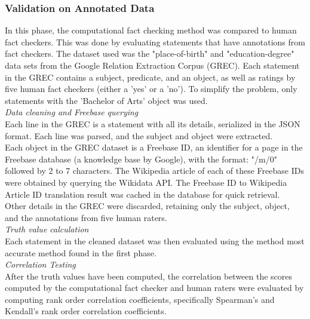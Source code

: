 \documentclass[10pt,11pt,12pt,oneside]{book}
\begin{document}
\subsubsection{Validation on Annotated Data}

In this phase, the computational fact checking method was compared to human fact checkers. This was done by evaluating statements that have annotations from fact checkers. The dataset used was the "place-of-birth" and "education-degree" data sets from the Google Relation Extraction Corpus (GREC). Each statement in the GREC contains a subject, predicate, and an object, as well as ratings by five human fact checkers (either a 'yes' or a 'no'). To simplify the problem, only statements with the 'Bachelor of Arts' object was used.\\



\textit{Data cleaning and Freebase querying}\\
Each line in the GREC is a statement with all its details, serialized in the JSON format. Each line was parsed, and the subject and object were extracted. \\

Each object in the GREC dataset is a Freebase ID, an identifier for a page in the Freebase database (a knowledge base by Google), with the format: "/m/0" followed by 2 to 7 characters. The Wikipedia article of each of these Freebase IDs were obtained by querying the Wikidata API. The Freebase ID to Wikipedia Article ID translation result was cached in the database for quick retrieval.\\

Other details in the GREC were discarded, retaining only the subject, object, and the annotations from five human raters.\\

\textit{Truth value calculation}\\

Each statement in the cleaned dataset was then evaluated using the method most accurate method found in the first phase.\\

\textit{Correlation Testing}\\
After the truth values have been computed, the correlation between the scores computed by the computational fact checker and human raters were evaluated by computing rank order correlation coefficients, specifically Spearman's and Kendall's rank order correlation coefficients.
\end{document}
